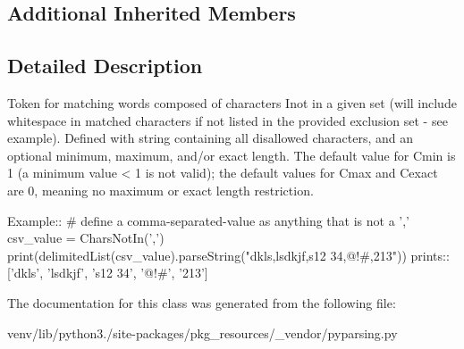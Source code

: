 \subsection*{Additional Inherited Members}


\subsection{Detailed Description}
\begin{DoxyVerb}Token for matching words composed of characters I{not} in a given set (will
include whitespace in matched characters if not listed in the provided exclusion set - see example).
Defined with string containing all disallowed characters, and an optional
minimum, maximum, and/or exact length.  The default value for C{min} is 1 (a
minimum value < 1 is not valid); the default values for C{max} and C{exact}
are 0, meaning no maximum or exact length restriction.

Example::
    # define a comma-separated-value as anything that is not a ','
    csv_value = CharsNotIn(',')
    print(delimitedList(csv_value).parseString("dkls,lsdkjf,s12 34,@!#,213"))
prints::
    ['dkls', 'lsdkjf', 's12 34', '@!#', '213']
\end{DoxyVerb}
 

The documentation for this class was generated from the following file\+:\begin{DoxyCompactItemize}
\item 
venv/lib/python3./site-\/packages/pkg\+\_\+resources/\+\_\+vendor/pyparsing.\+py\end{DoxyCompactItemize}
